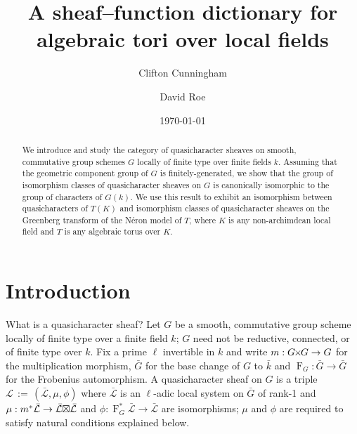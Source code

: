 \documentclass[11pt]{amsart}
\title[Sheaf--function dictionary for local tori]{A sheaf--function dictionary for algebraic tori over local fields}
\date{\today}
\author{Clifton Cunningham}
\author{David Roe}
\theoremstyle{plain}
\theoremstyle{definition}
\theoremstyle{remark}
\newcommand{\bFq}{\bar{k}}
\newcommand{\Fq}{k}
\newcommand{\Frob}[1]{\operatorname{F}_{#1}}
\newcommand{\ceq}{{\, :=\, }}
\newcommand{\qcs}[1]{{\mathcal{#1}}}
\newcommand{\gqcs}[1]{{\mathcal{\bar #1}}}
\newcommand{\bG}{\bar{G}}
\newcommand{\tight}[3]{\hspace{-#1pt}{#2}\hspace{-#3pt}}
\newcommand{\GxG}{\text{$G \tight{1}{\times}{1} G$}}
\newcommand{\LxL}{\text{$\gqcs{L} \tight{0}{\boxtimes}{0} \gqcs{L}$}}
\begin{document}
\begin{abstract}
  We introduce and study the category of quasicharacter sheaves on smooth,
  commutative group schemes $G$ locally of finite type over finite fields
  $\Fq$. Assuming that the geometric component group of $G$
  is finitely-generated, we show that the group of isomorphism classes
  of quasicharacter sheaves on $G$ is canonically isomorphic to the group
  of characters of $G(\Fq)$. We use this result to exhibit an
  isomorphism between quasicharacters of $T(K)$ and isomorphism
  classes of quasicharacter sheaves on the Greenberg transform of the Néron
  model of $T$, where $K$ is any non-archimdean local field and $T$ is
  any algebraic torus over $K$.
\end{abstract}

\maketitle

\section*{Introduction}

%
What is a quasicharacter sheaf?
Let $G$ be a smooth, commutative group scheme locally of finite
type over a finite field $\Fq$; $G$ need not be reductive, connected, or of
finite type over $\Fq$. Fix a prime $\ell$ invertible in $\Fq$
and write $m : \GxG \to G$ for the multiplication morphism,
$\bG$ for the base change of $G$ to $\bFq$ and
$\Frob{G} : \bG \to \bG$ for the Frobenius automorphism.
A quasicharacter sheaf on $G$ is a triple $\qcs{L}\ceq
(\gqcs{L},\mu,\phi)$ where $\gqcs{L}$ is an $\ell$-adic local system on $\bG$ of rank-1 and $\mu: m^*
\gqcs{L} \to \LxL$ and $\phi : \Frob{G}^*\gqcs{L} \to \gqcs{L}$ are isomorphisms;
$\mu$ and $\phi$ are required to satisfy natural conditions explained below.
\end{document}
